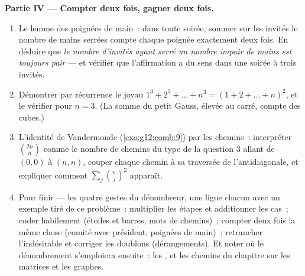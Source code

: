 \begin{problem}
\medskip
\noindent\textbf{Partie IV --- Compter deux fois, gagner deux
fois.}
\begin{enumerate}[resume]
  \item Le lemme des poignées de main~: dans toute soirée, sommer
        sur les invités le nombre de mains serrées compte chaque
        poignée exactement deux fois. En déduire que \emph{le nombre
        d'invités ayant serré un nombre impair de mains est toujours
        pair} --- et vérifier que l'affirmation a du sens dans une
        soirée à trois invités.
  \item Démontrer par récurrence le joyau
        $1^3 + 2^3 + \dots + n^3 = (1 + 2 + \dots + n)^2$, et le
        vérifier pour $n = 3$. (La somme du petit Gauss, élevée au
        carré, compte des cubes.)
  \item L'identité de Vandermonde (\cref{exo:g12:comb:9}) par les
        chemins~: interpréter $\binom{2n}{n}$ comme le nombre de
        chemins du type de la question 3 allant de $(0,0)$ à
        $(n,n)$, couper chaque chemin à sa traversée de
        l'antidiagonale, et expliquer comment $\sum_j \binom nj^2$
        apparaît.
  \item Pour finir --- les quatre gestes du dénombreur, une ligne
        chacun avec un exemple tiré de ce problème~: multiplier les
        étapes et additionner les cas~; coder habilement (étoiles et
        barres, mots de chemins)~; compter deux fois la même chose
        (comité avec président, poignées de main)~; retrancher
        l'indésirable et corriger les doublons (dérangements). Et
        noter où le dénombrement s'emploiera ensuite~: les
        , et les chemins du chapitre sur les matrices et
        les graphes.
\end{enumerate}
\end{problem}
